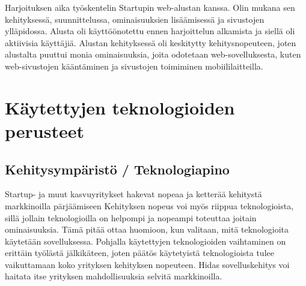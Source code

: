 \documentclass[11pt,a4paper,titlepage,oneside]{article}
\begin{document}
Harjoituksen aika työskentelin Startupin web-alustan kanssa. 
Olin mukana sen kehityksessä, suunnittelussa, ominaisuuksien lisäämisessä ja sivustojen ylläpidossa.
Alusta oli käyttöönotettu ennen harjoittelun alkamista ja siellä oli aktiivisia käyttäjiä.
Alustan kehityksessä oli keskitytty kehitysnopeuteen,
joten alustalta puuttui monia ominaisuuksia, joita odotetaan web-sovelluksesta, 
kuten web-sivustojen kääntäminen ja sivustojen toimiminen mobiililaitteilla.
\medskip

























\newpage
\section{Käytettyjen teknologioiden perusteet}                %



\subsection{Kehitysympäristö / Teknologiapino}



Startup- ja muut kasvuyritykset hakevat nopeaa ja ketterää kehitystä markkinoilla pärjäämiseen
Kehityksen nopeus voi myös riippua teknologioista, sillä jollain teknologioilla on helpompi ja nopeampi toteuttaa joitain ominaisuuksia.
Tämä pitää ottaa huomioon, kun valitaan, mitä teknologioita käytetään sovelluksessa.
Pohjalla käytettyjen teknologioiden vaihtaminen on erittäin työlästä jälkikäteen,
joten päätös käytetyistä teknologioista tulee vaikuttamaan koko yrityksen kehityksen nopeuteen.
Hidas sovelluskehitys voi haitata itse yrityksen mahdollisuuksia selvitä markkinoilla.
\medskip
\end{document}
